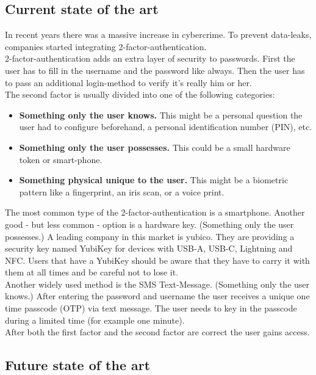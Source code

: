 \documentclass[conference]{IEEEtran}
\begin{document}
\subsection{Current state of the art}

In recent years there was a massive increase in cybercrime. To prevent data-leaks, companies started integrating 2-factor-authentication.\cite{b4}\\
2-factor-authentication adds an extra layer of security to passwords. First the user has to fill in the username and the password like always. Then the user has to pass an additional login-method to verify it's really him or her.\\
The second factor is usually divided into one of the following categories:
\begin{itemize}
    \item \textbf{Something only the user knows.}  This might be a personal question the user had to configure beforehand, a personal identification number (PIN), etc.
    \item \textbf{Something only the user possesses.} This could be a small hardware token or smart-phone.
    \item \textbf{Something physical unique to the user.} This might be a  biometric pattern like a fingerprint, an iris scan, or a voice print.
\end{itemize}
The most common type of the 2-factor-authentication is a smartphone. Another good - but less common - option is a hardware key. (Something only the user possesses.) A leading company in this market is yubico. They are providing a security key named YubiKey for devices with USB-A, USB-C, Lightning and NFC. Users that have a YubiKey should be aware that they have to carry it with them at all times and be careful not to lose it.\cite{b11}\\
Another widely used method is the SMS Text-Message. (Something only the user knows.) After entering the password and username the user receives a unique one time passcode (OTP) via text message. The user needs to key in the passcode during a limited time (for example one minute).\\
After both the first factor and the second factor are correct the user gains access.


\subsection{Future state of the art}
\end{document}
